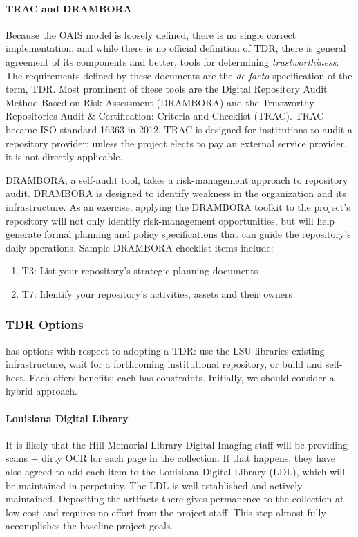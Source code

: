 \paragraph{TRAC and DRAMBORA}
Because the OAIS model is loosely defined, there is no single correct implementation, and while there is no official definition\cite{dow_elizabeth_2009} of TDR, there is general agreement of its components and better, tools for determining \emph{trustworthiness}. The requirements defined by these documents are the \emph{de facto} specification of the term, TDR. Most prominent of these tools are the Digital Repository Audit Method Based on Risk Assessment (DRAMBORA)\cite{drambora} and the Trustworthy Repositories Audit \& Certification: Criteria and Checklist (TRAC)\cite{trac}. TRAC became ISO standard 16363 in 2012\cite{trac_iso}. TRAC is designed for institutions to audit a repository provider; unless the project elects to pay an external service provider, it is not directly applicable. 

DRAMBORA, a self-audit tool, takes a risk-management approach to repository audit. DRAMBORA is designed to identify weakness in the organization and its infrastructure. As an exercise, applying the DRAMBORA toolkit to the project's repository will not only identify risk-management opportunities, but will help generate formal planning and policy specifications that can guide the repository's daily operations. Sample DRAMBORA checklist items include:
\begin{enumerate}
  \item{T3: List your repository’s strategic planning documents}
  \item{T7: Identify your repository’s activities, assets and their owners}
\end{enumerate}

\subsubsection{TDR Options}
\projectname{} has options with respect to adopting a TDR: use the LSU libraries existing infrastructure, wait for a forthcoming institutional repository, or build and self-host. Each offers benefits; each has constraints. Initially, we should consider a hybrid approach. 
\paragraph{Louisiana Digital Library}
It is likely that the Hill Memorial Library Digital Imaging staff will be providing scans + dirty OCR for each page in the collection. If that happens, they have also agreed to add each item to the Louisiana Digital Library (LDL), which will be maintained in perpetuity. The LDL is well-established and actively maintained. Depositing the \projectname{} artifacts there gives permanence to the collection at low cost and requires no effort from the project staff. This step almost fully accomplishes the baseline project goals. 

